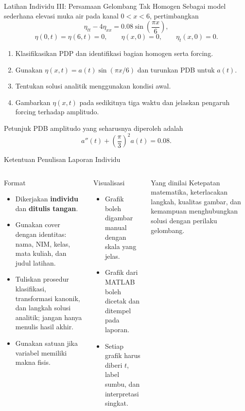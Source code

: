 \documentclass[aspectratio=169,10pt]{beamer}
\begin{document}
\begin{frame}{Latihan Individu III: Persamaan Gelombang Tak Homogen}
\small
Sebagai model sederhana elevasi muka air pada kanal $0<x<6$, pertimbangkan
\[
\boxed{\eta_{tt}-4\eta_{xx}=0.08\sin\left(\frac{\pi x}{6}\right)},
\]
\[
\eta(0,t)=\eta(6,t)=0,
\qquad
\eta(x,0)=0,
\qquad
\eta_t(x,0)=0.
\]
\begin{enumerate}
  \item Klasifikasikan PDP dan identifikasi bagian homogen serta forcing.
  \item Gunakan $\eta(x,t)=a(t)\sin(\pi x/6)$ dan turunkan PDB untuk $a(t)$.
  \item Tentukan solusi analitik menggunakan kondisi awal.
  \item Gambarkan $\eta(x,t)$ pada sedikitnya tiga waktu dan jelaskan pengaruh forcing terhadap amplitudo.
\end{enumerate}
\begin{block}{Petunjuk}
PDB amplitudo yang seharusnya diperoleh adalah
\[
a''(t)+\left(\frac{\pi}{3}\right)^2a(t)=0.08.
\]
\end{block}
\end{frame}

\begin{frame}{Ketentuan Penulisan Laporan Individu}
\begin{columns}[T,onlytextwidth]
\begin{block}{Format}
\begin{itemize}
  \item Dikerjakan \textbf{individu} dan \textbf{ditulis tangan}.
  \item Gunakan cover dengan identitas: nama, NIM, kelas, mata kuliah, dan judul latihan.
  \item Tuliskan prosedur klasifikasi, transformasi kanonik, dan langkah solusi analitik; jangan hanya menulis hasil akhir.
  \item Gunakan satuan jika variabel memiliki makna fisis.
\end{itemize}
\end{block}
\begin{block}{Visualisasi}
\begin{itemize}
  \item Grafik boleh digambar manual dengan skala yang jelas.
  \item Grafik dari MATLAB boleh dicetak dan ditempel pada laporan.
  \item Setiap grafik harus diberi $t$, label sumbu, dan interpretasi singkat.
\end{itemize}
\end{block}
\begin{block}{Yang dinilai}
Ketepatan matematika, keterlacakan langkah, kualitas gambar, dan kemampuan menghubungkan solusi dengan perilaku gelombang.
\end{block}
\end{columns}
\end{frame}
\end{document}
